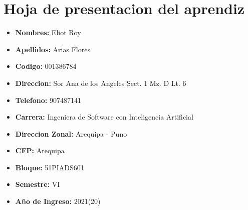 \newpage
\section*{Hoja de presentacion del aprendiz}

\begin{itemize}
    \item[] \textbf{Nombres: }Eliot Roy
    \item[] \textbf{Apellidos: }Arias Flores
    \item[] \textbf{Codigo: }001386784
    \item[] \textbf{Direccion: }Sor Ana de los Angeles Sect. 1 Mz. D Lt. 6
    \item[] \textbf{Telefono: }907487141
    \item[] \textbf{Carrera: }Ingeniera de Software con Inteligencia Artificial
    \item[] \textbf{Direccion Zonal: }Arequipa - Puno
    \item[] \textbf{CFP: }Arequipa
    \item[] \textbf{Bloque: }51PIADS601
    \item[] \textbf{Semestre: }VI
    \item[] \textbf{Año de Ingreso: }2021(20)
\end{itemize}